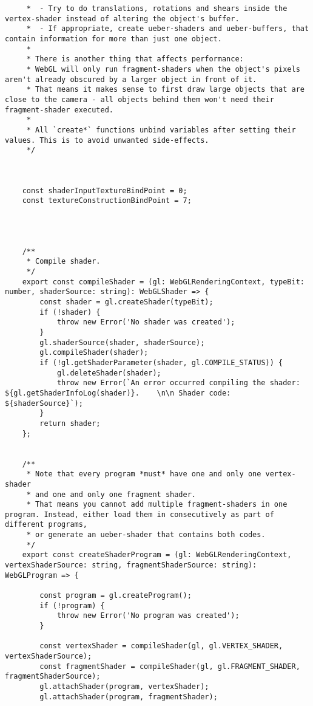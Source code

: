 {\begin{lstlisting}
     *  - Try to do translations, rotations and shears inside the vertex-shader instead of altering the object's buffer.
     *  - If appropriate, create ueber-shaders and ueber-buffers, that contain information for more than just one object.
     *
     * There is another thing that affects performance:
     * WebGL will only run fragment-shaders when the object's pixels aren't already obscured by a larger object in front of it.
     * That means it makes sense to first draw large objects that are close to the camera - all objects behind them won't need their fragment-shader executed.
     *
     * All `create*` functions unbind variables after setting their values. This is to avoid unwanted side-effects.
     */
    
    
    
    const shaderInputTextureBindPoint = 0;
    const textureConstructionBindPoint = 7;
    
    
    
    
    /**
     * Compile shader.
     */
    export const compileShader = (gl: WebGLRenderingContext, typeBit: number, shaderSource: string): WebGLShader => {
        const shader = gl.createShader(typeBit);
        if (!shader) {
            throw new Error('No shader was created');
        }
        gl.shaderSource(shader, shaderSource);
        gl.compileShader(shader);
        if (!gl.getShaderParameter(shader, gl.COMPILE_STATUS)) {
            gl.deleteShader(shader);
            throw new Error(`An error occurred compiling the shader: ${gl.getShaderInfoLog(shader)}.    \n\n Shader code: ${shaderSource}`);
        }
        return shader;
    };
    
    
    /**
     * Note that every program *must* have one and only one vertex-shader
     * and one and only one fragment shader.
     * That means you cannot add multiple fragment-shaders in one program. Instead, either load them in consecutively as part of different programs,
     * or generate an ueber-shader that contains both codes.
     */
    export const createShaderProgram = (gl: WebGLRenderingContext, vertexShaderSource: string, fragmentShaderSource: string): WebGLProgram => {
    
        const program = gl.createProgram();
        if (!program) {
            throw new Error('No program was created');
        }
    
        const vertexShader = compileShader(gl, gl.VERTEX_SHADER, vertexShaderSource);
        const fragmentShader = compileShader(gl, gl.FRAGMENT_SHADER, fragmentShaderSource);
        gl.attachShader(program, vertexShader);
        gl.attachShader(program, fragmentShader);
    

\end{lstlisting}}

